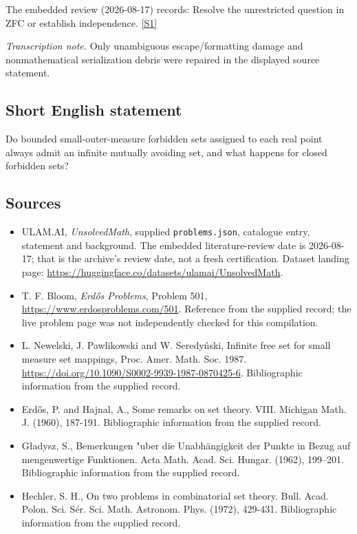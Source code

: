 \documentclass[11pt,a4paper]{article}
\newcommand{\sref}[2]{\hyperlink{source:#1:#2}{[S#2]}}
\begin{document}
The embedded review (2026-08-17) records: Resolve the unrestricted question in ZFC or establish independence. \sref{statement}{1}

{\small\emph{Transcription note.} Only unambiguous escape/formatting damage and nonmathematical serialization debris were repaired in the displayed source statement.}

\subsection{Short English statement}

Do bounded small-outer-measure forbidden sets assigned to each real point always admit an infinite mutually avoiding set, and what happens for closed forbidden sets?

\subsection{Sources}

{\small

\begin{itemize}

\item[\hypertarget{source:statement:1}{S1}] ULAM.AI, \emph{UnsolvedMath}, supplied \texttt{problems.json}, catalogue entry, statement and background. The embedded literature-review date is 2026-08-17; that is the archive’s review date, not a fresh certification. Dataset landing page: \url{https://huggingface.co/datasets/ulamai/UnsolvedMath}.

\item[\hypertarget{source:statement:2}{S2}] T. F. Bloom, \emph{Erdős Problems}, Problem 501, \url{https://www.erdosproblems.com/501}. Reference from the supplied record; the live problem page was not independently checked for this compilation.

\item[\hypertarget{source:statement:3}{S3}] L. Newelski, J. Pawlikowski and W. Seredyński, Infinite free set for small measure set mappings, Proc. Amer. Math. Soc. 1987. \url{https://doi.org/10.1090/S0002-9939-1987-0870425-6}. Bibliographic information from the supplied record.

\item[\hypertarget{source:statement:4}{S4}] Erd\H{o}s, P. and Hajnal, A., Some remarks on set theory. VIII. Michigan Math. J. (1960), 187-191. Bibliographic information from the supplied record.

\item[\hypertarget{source:statement:5}{S5}] G\l adysz, S., Bemerkungen "uber die {U}nabh\"{a}ngigkeit der {P}unkte in {B}ezug auf mengenwertige {F}unktionen. Acta Math. Acad. Sci. Hungar. (1962), 199--201. Bibliographic information from the supplied record.

\item[\hypertarget{source:statement:6}{S6}] Hechler, S. H., On two problems in combinatorial set theory. Bull. Acad. Polon. Sci. S\'{e}r. Sci. Math. Astronom. Phys. (1972), 429-431. Bibliographic information from the supplied record.

\end{itemize}

}

\label{end:statement}
\end{document}
